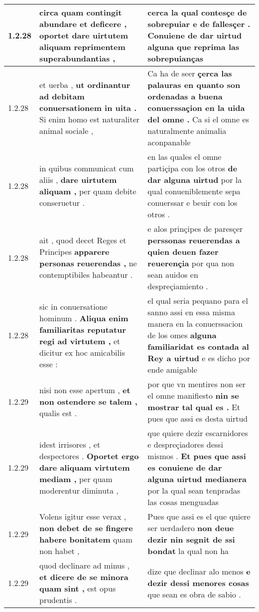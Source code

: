 \begin{tabular}{|p{1cm}|p{6.5cm}|p{6.5cm}|}
1.2.28 & circa quam contingit abundare et deficere , \textbf{ oportet dare uirtutem } aliquam reprimentem superabundantias , & cerca la qual contesçe de sobrepuiar e de fallesçer . \textbf{ Conuiene de dar uirtud alguna } que reprima las sobrepuianças \\\hline
1.2.28 & et uerba , \textbf{ ut ordinantur ad debitam conuersationem in uita . } Si enim homo est naturaliter animal sociale , & Ca ha de seer \textbf{ çerca las palauras en quanto son ordenadas a buena conuerssaçion en la uida del omne . } Ca si el omne es naturalmente animalia aconpanable \\\hline
1.2.28 & in quibus communicat cum aliis , \textbf{ dare uirtutem aliquam , } per quam debite conseruetur . & en las quales el omne partiçipa con los otros \textbf{ de dar alguna uirtud } por la qual conueniblemente sepa conuerssar e beuir con los otros . \\\hline
1.2.28 & ait , quod decet Reges et Principes \textbf{ apparere personas reuerendas , } ne contemptibiles habeantur . & e alos prinçipes de paresçer \textbf{ perssonas reuerendas a quien deuen fazer reuerençia } por qua non sean auidos en despreçiamiento . \\\hline
1.2.28 & sic in conuersatione hominum . \textbf{ Aliqua enim familiaritas reputatur regi ad virtutem , } et dicitur ex hoc amicabilis esse : & el qual seria pequano para el sanno assi en essa misma manera en la conuerssacion de los omes \textbf{ alguna familiaridat es contada al Rey a uirtud } e es dicho por ende amigable \\\hline
1.2.29 & nisi non esse apertum , \textbf{ et non ostendere se talem , } qualis est . & por que vn mentires non ser el omne manifiesto \textbf{ nin se mostrar tal qual es . } Et pues que assi es desta uirtud \\\hline
1.2.29 & idest irrisores , et despectores . \textbf{ Oportet ergo dare aliquam virtutem mediam , } per quam moderentur diminuta , & que quiere dezir escarnidores e despreçiadores dessi mismos . \textbf{ Et pues que assi es conuiene de dar alguna uirtud medianera } por la qual sean tenpradas las cosas menguadas \\\hline
1.2.29 & Volens igitur esse verax , \textbf{ non debet de se fingere habere bonitatem } quam non habet , & Pues que assi es el que quiere ser uerdadero \textbf{ non deue dezir nin segnit de ssi bondat } la qual non ha \\\hline
1.2.29 & quod declinare ad minus , \textbf{ et dicere de se minora quam sint , } est opus prudentis . & dize que declinar alo menos \textbf{ e dezir dessi menores cosas } que sean es obra de sabio . \\\hline

\end{tabular}
